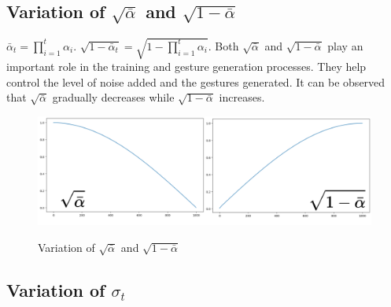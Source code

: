 \subsection{Variation of $\sqrt{\bar{\alpha}}$ and $\sqrt{1 - \bar{\alpha}}$}

$\bar{\alpha}_t = \prod_{i=1}^t \alpha_i$.  $\sqrt{1 - \bar{\alpha}_t} = \sqrt{1 - \prod_{i=1}^t \alpha_i}$. Both $\sqrt{\bar{\alpha}}$ and $\sqrt{1 - \bar{\alpha}}$ play an important role in the training and gesture generation processes. They help control the level of noise added and the gestures generated. It can be observed that $\sqrt{\bar{\alpha}}$ gradually decreases while $\sqrt{1 - \bar{\alpha}}$ increases.

\begin{figure}[h]
	\includegraphics[width=\linewidth]{images/AlphaCumprod}
	\label{fig:AlphaCumprod}
	\caption{Variation of $\sqrt{\bar{\alpha}}$ and $\sqrt{1 - \bar{\alpha}}$}
\end{figure}


\subsection{Variation of $\sigma_t$}
\label{appendix:Appendix1:NoiseScale}

